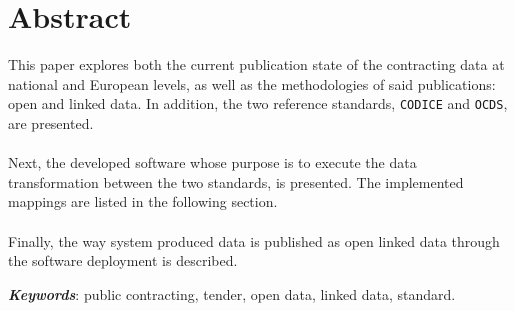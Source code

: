 \addtocounter{page}{-1}

\vspace*{15em}
\section*{Abstract}
    \vspace{0.5cm}
    \begin{adjustwidth}{50pt}{50pt}
        \hspace{15pt} This paper explores both the current  publication state of the contracting data at national and European levels, as well as the methodologies of said publications: open and linked data. In addition, the two reference standards, \texttt{CODICE} and \texttt{OCDS}, are presented.
        \\ \\
        \indent Next, the developed software whose purpose is to execute the data transformation between the two standards, is presented. The implemented mappings are listed in the following section.
        \\ \\
        \indent Finally, the way system produced data is published as open linked data through the software deployment is described.
    \end{adjustwidth}
    \vspace{1cm}
    \hspace{0.5cm} \textbf{\textit{Keywords}}: public contracting, tender, open data, linked data, standard.

{}

\newpage
